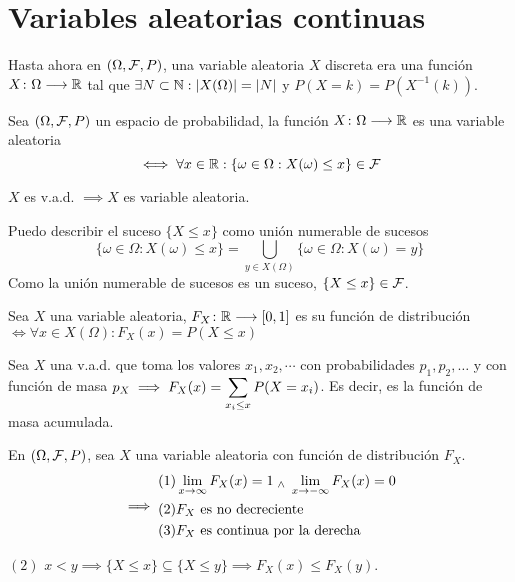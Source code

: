 \section{Variables aleatorias continuas}
Hasta ahora en $(\Omega, \mathcal{F}, P)$, una variable aleatoria $X$ discreta era una función $X \colon \Omega \longrightarrow \mathbb{R}$ tal que $\exists N \subset \mathbb{N} : \left|X(\Omega)\right|=\left|N\right|$ y $P(X=k)=P(X^{-1}(k))$.
\begin{defn}
	Sea $(\Omega, \mathcal{F}, P)$ un espacio de probabilidad, la función $X \colon \Omega \longrightarrow \mathbb{R}$ es una variable aleatoria
	\[\iff \forall x \in \mathbb{R} : \{\omega\in\Omega : X(\omega) \leq x\} \in \mathcal{F}\]
\end{defn}
\begin{prop}
	$X$ es v.a.d. $\implies X$ es variable aleatoria.
	\begin{dem}
		Puedo describir el suceso $\{X\leq x\}$ como unión numerable de sucesos
		\[\{\omega \in\Omega : X(\omega) \leq x\} = \bigcup_{y\in X(\Omega)} \{\omega \in \Omega : X(\omega) = y\}\]
		Como la unión numerable de sucesos es un suceso, $\{X\leq x\} \in \mathcal{F}$.
	\end{dem}
\end{prop}
\begin{defn}
	Sea $X$ una variable aleatoria, $F_X \colon \mathbb{R} \longrightarrow [0,1]$ es su función de distribución $\iff \forall x \in X(\Omega) : \boxed{F_X(x) = P(X\leq x)}$
\end{defn}
Sea $X$ una v.a.d. que toma los valores $x_1, x_2, \cdots$ con probabilidades $p_1, p_2, \dots$ y con función de masa $p_X \displaystyle \implies F_X(x) = \sum_{x_i \leq x} P(X=x_i)$. Es decir, es la función de masa acumulada.
\begin{lem}
	En $(\Omega, \mathcal{F}, P)$, sea $X$ una variable aleatoria con función de distribución $F_X$.
	\[\implies \begin{aligned}
			(1) & \lim_{x\to\infty} F_X(x) = 1 \; _{\wedge} \; \lim_{x\to-\infty} F_X(x) = 0 \\
			(2) & F_X \text{ es no decreciente}                                  \\
			(3) & F_X \text{ es continua por la derecha}
		\end{aligned}\]
	\begin{dem} %
		$(2)$ $x<y \implies \{X\leq x\} \subseteq \{X\leq y\} \implies F_X(x) \leq F_X(y)$.
	\end{dem}
\end{lem}
